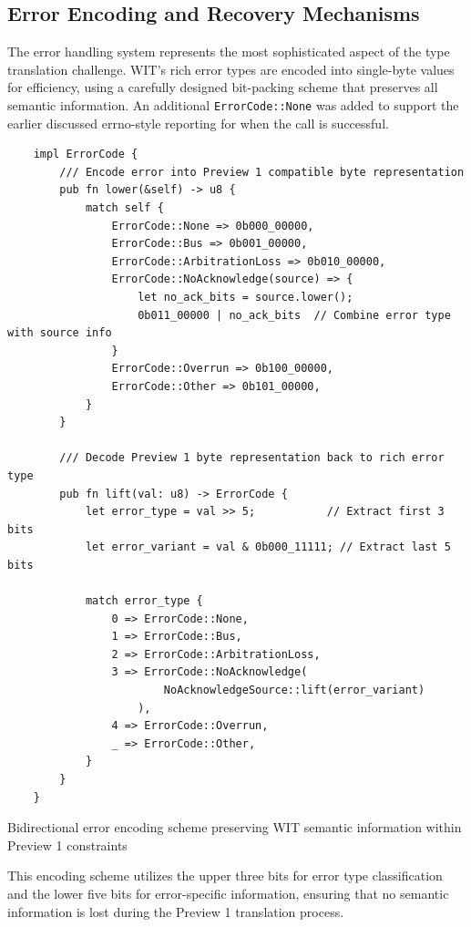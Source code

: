 \subsection{Error Encoding and Recovery Mechanisms}

The error handling system represents the most sophisticated aspect of the type translation challenge. WIT's rich error types are encoded into single-byte values for efficiency, using a carefully designed bit-packing scheme that preserves all semantic information. An additional \texttt{ErrorCode::None} was added to support the earlier discussed errno-style reporting for when the call is successful.

\begin{listing}[H]
    \begin{verbatim}
    impl ErrorCode {
        /// Encode error into Preview 1 compatible byte representation
        pub fn lower(&self) -> u8 {
            match self {
                ErrorCode::None => 0b000_00000,
                ErrorCode::Bus => 0b001_00000,
                ErrorCode::ArbitrationLoss => 0b010_00000,
                ErrorCode::NoAcknowledge(source) => {
                    let no_ack_bits = source.lower();
                    0b011_00000 | no_ack_bits  // Combine error type with source info
                }
                ErrorCode::Overrun => 0b100_00000,
                ErrorCode::Other => 0b101_00000,
            }
        }
    
        /// Decode Preview 1 byte representation back to rich error type
        pub fn lift(val: u8) -> ErrorCode {
            let error_type = val >> 5;           // Extract first 3 bits
            let error_variant = val & 0b000_11111; // Extract last 5 bits
            
            match error_type {
                0 => ErrorCode::None,
                1 => ErrorCode::Bus,
                2 => ErrorCode::ArbitrationLoss,
                3 => ErrorCode::NoAcknowledge(
                        NoAcknowledgeSource::lift(error_variant)
                    ),
                4 => ErrorCode::Overrun,
                _ => ErrorCode::Other,
            }
        }
    }
    \end{verbatim}
    \caption{Bidirectional error encoding scheme preserving WIT semantic information within Preview 1 constraints}
    \label{lst:error-encoding}
\end{listing}

This encoding scheme utilizes the upper three bits for error type classification and the lower five bits for error-specific information, ensuring that no semantic information is lost during the Preview 1 translation process.

